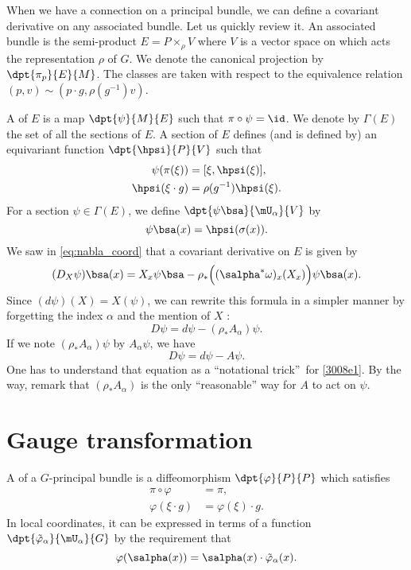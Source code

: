 When we have a connection on a principal bundle, we can define a covariant derivative on any associated bundle. Let us quickly review it. An associated bundle is the semi-product $E=P\times_{\rho} V$ where $V$ is a vector space on which acts the representation $\rho$ of $G$. We denote the canonical projection by $\dpt{\pi_p}{E}{M}$. The classes are taken with respect to the equivalence relation $(p,v)\sim(p\cdot g,\rho(g^{-1})v)$.

A  of $E$ is a map $\dpt{\psi}{M}{E}$ such that $\pi\circ\psi=\id$. We denote by $\Gamma(E)$ the set of all the sections of $E$. A section of $E$ defines (and is defined by) an equivariant function $\dpt{\hpsi}{P}{V}$ such that
\begin{subequations}
\begin{align}
  \psi(\pi(\xi))&=[\xi,\hpsi(\xi)],\\
  \hpsi(\xi\cdot g)&=\rho(g^{-1})\hpsi(\xi).
\end{align}
\end{subequations}
For a section $\psi\in\Gamma(E)$, we define $\dpt{\psi\bsa}{\mU_{\alpha}}{V}$ by
 \[
 \psi\bsa(x)=\hpsi(\sigma(x)).
 \]
We saw in \eqref{eq:nabla_coord} that a covariant derivative on $E$ is given by
\begin{equation}\label{3008e1}
  (D_X\psi)\bsa(x)=X_x\psi\bsa-\rho_*\Big((\salpha^*\omega)_x(X_x)\Big)\psi\bsa(x).
\end{equation}
Since $(d\psi)(X)=X(\psi)$, we can rewrite this formula in a simpler manner by forgetting the index $\alpha$ and the mention of $X$ :
\[
    D\psi=d\psi-(\rho_*A_{\alpha})\psi.
\]
If we note $(\rho_*A_{\alpha})\psi$ by $A_{\alpha}\psi$, we have
\begin{equation}
        D\psi=d\psi-A\psi.
\end{equation}
One has to understand that equation as a ``notational trick''\ for \eqref{3008e1}. By the way, remark that $(\rho_*A_{\alpha})$ is the only ``reasonable'' way for $A$ to act on $\psi$.

\section{Gauge transformation}

A  of a $G$-principal bundle is a diffeomorphism $\dpt{\varphi}{P}{P}$ which satisfies
\begin{subequations}
\begin{align}
   \pi\circ\varphi&=\pi,\\
   \varphi(\xi\cdot g)&=\varphi(\xi)\cdot g.
\end{align}
\end{subequations}
In local coordinates, it can be expressed in terms of a function $\dpt{\tilde{\varphi}_{\alpha}}{\mU_{\alpha}}{G}$ by the requirement that
\begin{equation}\label{def_vpt}
    \varphi(\salpha(x))=\salpha(x)\cdot\tilde{\varphi}_{\alpha}(x).
\end{equation}

